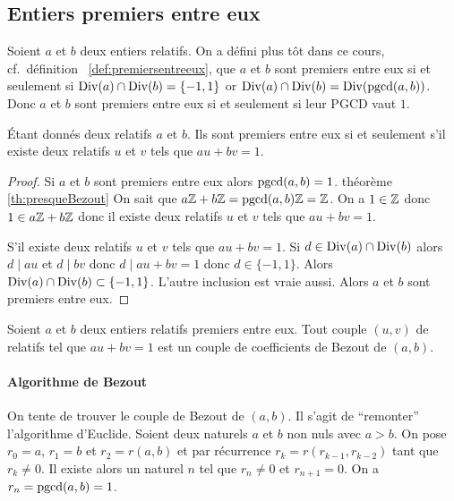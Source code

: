 \subsection{Entiers premiers entre eux}

Soient \(a\) et \(b\) deux entiers relatifs. On a défini plus tôt dans ce cours, 
cf.\ définition~
\ref{def:premiersentreeux}, que \(a\) et \(b\) sont premiers entre eux si et 
seulement si \(\operatorname{Div}(a) \cap \operatorname{Div}(b)=\{-1,1\}\) or \(\operatorname{Div}(a) \cap \operatorname{Div}(b) = 
\operatorname{Div}(\operatorname{pgcd}(a,b))\). Donc \(a\) et \(b\) sont premiers entre eux si et seulement 
si leur PGCD vaut \(1\).

\begin{theo}
  Étant donnés deux relatifs \(a\) et \(b\). Ils sont premiers entre eux si et 
  seulement s'il existe deux relatifs \(u\) et \(v\) tels que \(au+bv=1\).
\end{theo}
\begin{proof}
  Si \(a\) et \(b\) sont premiers entre eux alors \(\operatorname{pgcd}(a,b) =1\). %
  théorème~
  \ref{th:presqueBezout}
  On sait que \(a\mathbb{Z}+b\mathbb{Z}=\operatorname{pgcd}(a,b)\mathbb{Z}=\mathbb{Z}\). On a \(1 \in \mathbb{Z}\) donc \(1 \in 
  a\mathbb{Z}+b\mathbb{Z}\) donc il existe deux relatifs \(u\) et \(v\) tels que \(au+bv=1\).

  S'il existe deux relatifs \(u\) et \(v\) tels que \(au+bv=1\). Si \(d \in 
  \operatorname{Div}(a) \cap \operatorname{Div}(b)\) alors \(d \mid au\) et \(d \mid bv\) donc \(d \mid 
  au+bv=1\) donc \(d \in \{-1,1\}\). Alors \(\operatorname{Div}(a) \cap \operatorname{Div}(b) \subset 
  \{-1,1\}\). L'autre inclusion est vraie aussi. Alors \(a\) et \(b\) sont 
  premiers entre eux.
\end{proof}

\begin{defdef}
  Soient \(a\) et \(b\) deux entiers relatifs premiers entre eux. Tout couple 
  \((u,v)\) de relatifs tel que \(au+bv=1\) est un couple de coefficients de 
  Bezout de \((a,b)\).
\end{defdef}

\paragraph{Algorithme de Bezout}

On tente de trouver le couple de Bezout de \((a,b)\). Il s'agit de ``remonter'' 
l'algorithme d'Euclide. Soient deux naturels \(a\) et \(b\) non nuls avec 
\(a>b\). On pose \(r_0=a\), \(r_1=b\) et \(r_2=r(a,b)\) et par récurrence 
\(r_k=r(r_{k-1}, r_{k-2})\) tant que \(r_k \neq 0\). Il existe alors un naturel 
\(n\) tel que \(r_n \neq 0\) et \(r_{n+1}=0\). On a \(r_n=\operatorname{pgcd}(a,b)=1\).

